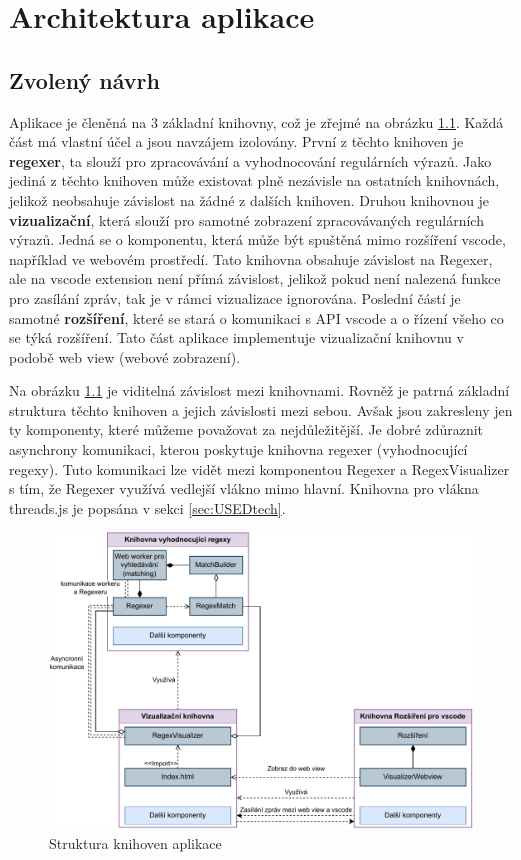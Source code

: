 \chapter{Architektura aplikace}\label{sec:ApplicationTechnology}

\section{Zvolený návrh}

Aplikace je členěná na 3 základní knihovny, což je zřejmé na obrázku \ref{fig:ARCH}.
Každá část má vlastní účel a jsou navzájem izolovány.
První z těchto knihoven je \textbf{regexer}, ta slouží pro zpracovávání a vyhodnocování regulárních výrazů.
Jako jediná z těchto knihoven může existovat plně nezávisle na ostatních knihovnách, jelikož neobsahuje závislost na žádné z dalších knihoven.
Druhou knihovnou je \textbf{vizualizační}, která slouží pro samotné zobrazení zpracovávaných regulárních výrazů.
Jedná se o komponentu, která může být spuštěná mimo rozšíření vscode, například ve webovém prostředí.
Tato knihovna obsahuje závislost na Regexer, ale na vscode extension není přímá závislost, jelikož pokud není nalezená funkce pro zasílání zpráv, tak je v rámci vizualizace ignorována.
Poslední částí je samotné \textbf{rozšíření}, které se stará o komunikaci s API vscode a o řízení všeho co se týká rozšíření.
Tato část aplikace implementuje vizualizační knihovnu v podobě web view (webové zobrazení).

Na obrázku \ref{fig:ARCH} je viditelná závislost mezi knihovnami. 
Rovněž je patrná základní struktura těchto knihoven a jejich závislosti mezi sebou.
Avšak jsou zakresleny jen ty komponenty, které můžeme považovat za nejdůležitější. 
Je dobré zdůraznit asynchrony komunikaci, kterou poskytuje knihovna regexer (vyhodnocující regexy).
Tuto komunikaci lze vidět mezi komponentou Regexer a RegexVisualizer s tím, že Regexer využívá vedlejší vlákno mimo hlavní. 
Knihovna pro vlákna threads.js je popsána v sekci \ref{sec:USEDtech}.

\begin{figure}[!h]
	\centering
	\includegraphics[width=.9\textwidth]{Figures/BP-Arch.pdf}
	\caption{Struktura knihoven aplikace}
	\label{fig:ARCH}
\end{figure}

